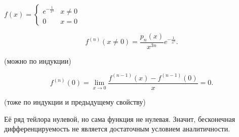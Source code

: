 \begin{example} \thmslashn

    $f(x) = \begin{cases}
        e^{-\frac{1}{x^2}} & x \neq 0\\
        0 & x = 0
    \end{cases}$ 

    \[ f^{(n)}(x \neq 0) = \frac{p_{n}(x)}{x^{3n}}e^{-\frac{1}{x^2}} .\] 

    (можно по индукции)

    \[ f^{(n)}(0) = \lim\limits_{x \to 0} \frac{f^{(n-1)}(x) - f^{(n-1)}(0)}{x} = 0.\]

    (тоже по индукции и предыдущему свойству)

    Её ряд тейлора нулевой, но сама функция не нулевая. Значит, бесконечная дифференцируемость не является достаточным условием аналитичности.
\end{example}
